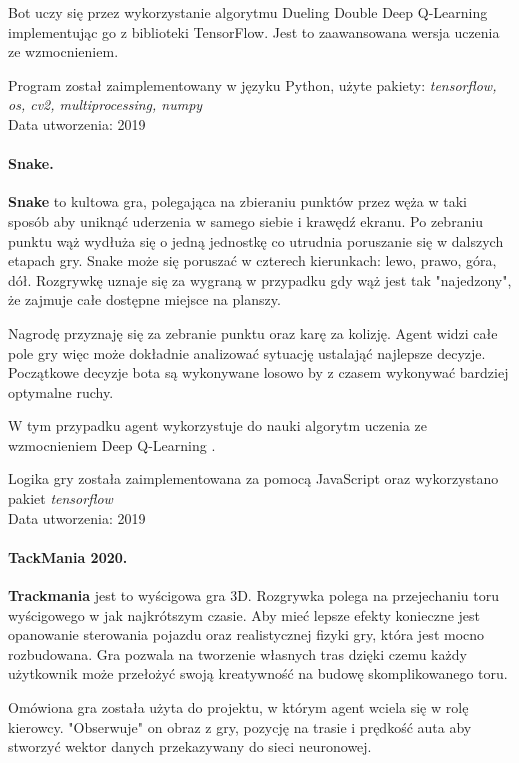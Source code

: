 \documentclass{iiuwb}
\begin{document}
\begin{itemize}
Bot uczy się przez wykorzystanie algorytmu Dueling Double Deep Q-Learning \cite{BubbleShooter} implementując go z biblioteki TensorFlow. Jest to zaawansowana wersja uczenia ze wzmocnieniem.

Program został zaimplementowany w języku Python, użyte pakiety: \textit{tensorflow, os, cv2, multiprocessing, numpy}\\
Data utworzenia: 2019

\paragraph{Snake.}
\textbf{Snake} to kultowa gra, polegająca na zbieraniu punktów przez węża w taki sposób aby uniknąć uderzenia w samego siebie i krawędź ekranu. Po zebraniu punktu wąż wydłuża się o jedną jednostkę co utrudnia poruszanie się w dalszych etapach gry. Snake może się poruszać w czterech kierunkach: lewo, prawo, góra, dół. Rozgrywkę uznaje się za wygraną w przypadku gdy wąż jest tak "najedzony", że zajmuje całe dostępne miejsce na planszy.

Nagrodę przyznaję się za zebranie punktu oraz karę za kolizję. Agent widzi całe pole gry więc może dokładnie analizować sytuację ustalająć najlepsze decyzje. Początkowe decyzje bota są wykonywane losowo by z czasem wykonywać bardziej optymalne ruchy.

W tym przypadku agent wykorzystuje do nauki algorytm uczenia ze wzmocnieniem Deep Q-Learning \cite{Snake}.

Logika gry została zaimplementowana za pomocą JavaScript oraz wykorzystano pakiet \textit{tensorflow} \\
Data utworzenia: 2019

\paragraph{TackMania 2020.}
\textbf{Trackmania} jest to wyścigowa gra 3D. Rozgrywka polega na przejechaniu toru wyścigowego w jak najkrótszym czasie. Aby mieć lepsze efekty konieczne jest opanowanie sterowania pojazdu oraz realistycznej fizyki gry, która jest mocno rozbudowana. Gra pozwala na tworzenie własnych tras dzięki czemu każdy użytkownik może przełożyć swoją kreatywność na budowę skomplikowanego toru.

Omówiona gra została użyta do projektu, w którym agent wciela się w rolę kierowcy. "Obserwuje" on obraz z gry, pozycję na trasie i prędkość auta aby stworzyć wektor danych przekazywany do sieci neuronowej.


\end{itemize}
\end{document}
